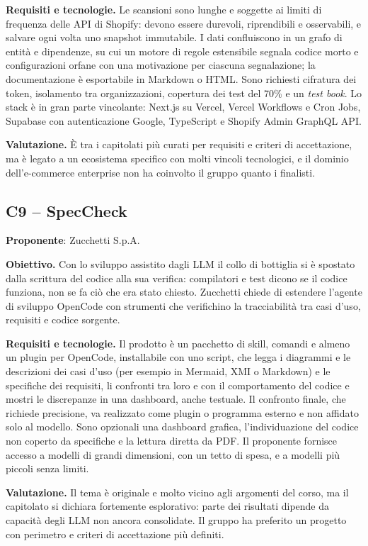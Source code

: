 \textbf{Requisiti e tecnologie.} Le scansioni sono lunghe e soggette ai
limiti di frequenza delle API di Shopify: devono essere durevoli,
riprendibili e osservabili, e salvare ogni volta uno snapshot immutabile.
I dati confluiscono in un grafo di entità e dipendenze, su cui un motore di
regole estensibile segnala codice morto e configurazioni orfane con una
motivazione per ciascuna segnalazione; la documentazione è esportabile in
Markdown o HTML. Sono richiesti cifratura dei token, isolamento tra
organizzazioni, copertura dei test del 70\% e un \emph{test book}. Lo
stack è in gran parte vincolante: Next.js su Vercel, Vercel Workflows e
Cron Jobs, Supabase con autenticazione Google, TypeScript e Shopify Admin
GraphQL API.

\textbf{Valutazione.} È tra i capitolati più curati per requisiti e criteri
di accettazione, ma è legato a un ecosistema specifico con molti vincoli
tecnologici, e il dominio dell'e-commerce enterprise non ha coinvolto il
gruppo quanto i finalisti.

\subsection{C9 -- SpecCheck}
\textbf{Proponente}: Zucchetti S.p.A.

\textbf{Obiettivo.} Con lo sviluppo assistito dagli LLM il collo di
bottiglia si è spostato dalla scrittura del codice alla sua verifica:
compilatori e test dicono se il codice funziona, non se fa ciò che era
stato chiesto. Zucchetti chiede di estendere l'agente di sviluppo
OpenCode con strumenti che verifichino la tracciabilità tra casi d'uso,
requisiti e codice sorgente.

\textbf{Requisiti e tecnologie.} Il prodotto è un pacchetto di skill,
comandi e almeno un plugin per OpenCode, installabile con uno script, che
legga i diagrammi e le descrizioni dei casi d'uso (per esempio in Mermaid,
XMI o Markdown) e le specifiche dei requisiti, li confronti tra loro e con
il comportamento del codice e mostri le discrepanze in una dashboard,
anche testuale. Il confronto finale, che richiede precisione, va
realizzato come plugin o programma esterno e non affidato solo al modello.
Sono opzionali una dashboard grafica, l'individuazione del codice non
coperto da specifiche e la lettura diretta da PDF. Il proponente fornisce
accesso a modelli di grandi dimensioni, con un tetto di spesa, e a
modelli più piccoli senza limiti.

\textbf{Valutazione.} Il tema è originale e molto vicino agli argomenti del
corso, ma il capitolato si dichiara fortemente esplorativo: parte dei
risultati dipende da capacità degli LLM non ancora consolidate. Il gruppo
ha preferito un progetto con perimetro e criteri di accettazione più
definiti.
